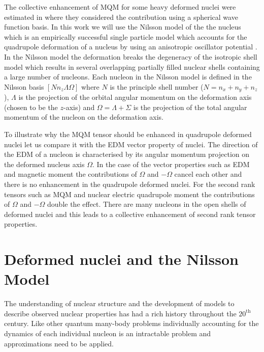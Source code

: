 \documentclass[8pt,a4paper, twoside]{report}
\begin{document}
 \linebreak
The collective enhancement of MQM for some  heavy deformed nuclei were estimated in \cite{Flambaum1994, Flambaum2014} where they considered the contribution using a spherical wave function basis. In this work we will use the Nilsson model of the the nucleus  which is an empirically successful single particle model which accounts for the quadrupole deformation of a nucleus by using an anisotropic oscillator potential \cite{Nilsson1955, Mottelson1955, BohrMottVol2}. In the Nilsson model the deformation breaks the degeneracy of the isotropic shell model which results in several overlapping partially filled nuclear shells containing a large number of nucleons.  Each nucleon in the Nilsson model is defined in the Nilsson basis $\left[Nn_z\Lambda\Omega\right]$ where $N$ is the principle shell number ($N = n_x + n_y + n_z$), $\Lambda$ is the projection of the orbital angular momentum on the deformation axis (chosen to be the $z$-axis) and $\Omega = \Lambda + \Sigma$ is the projection of the total angular momentum of the nucleon on the deformation axis.


To illustrate why the MQM tensor should be enhanced in quadrupole deformed nuclei let us compare it with  the EDM vector property of nuclei. The direction of the EDM of a nucleon is characterised by its angular momentum projection on the deformed nucleus axis $\Omega$. In the case of the vector properties such as EDM and magnetic moment the contributions of $\Omega$ and $-\Omega$ cancel each other and  there is no enhancement in the quadrupole deformed nuclei. For the second rank tensors such as MQM and nuclear electric quadrupole moment the contributions of $\Omega$ and $-\Omega$ double the effect. There are many nucleons in the open shells of deformed nuclei and this leads to a collective enhancement of second rank tensor properties.


\chapter{Deformed nuclei and the Nilsson Model}
The understanding of nuclear structure and the development of models to describe observed nuclear properties has had a rich history throughout the $20^{\text{th}}$ century. Like other quantum many-body problems individually accounting for the dynamics of each individual nucleon is an intractable problem and approximations need to be applied. 
\end{document}
